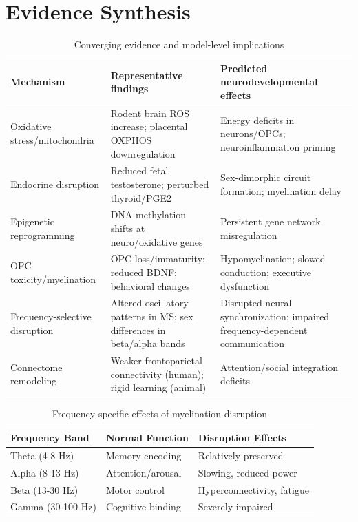 \documentclass[12pt]{article}
\begin{document}
\section{Evidence Synthesis}

\begin{table}[h]
\centering
\caption{Converging evidence and model-level implications}
\label{tab:mechanisms}
\begin{tabular}{@{}p{3cm}p{5cm}p{5cm}@{}}
\toprule
\textbf{Mechanism} & \textbf{Representative findings} & \textbf{Predicted neurodevelopmental effects} \\
\midrule
Oxidative stress/mitochondria & Rodent brain ROS increase; placental OXPHOS downregulation & Energy deficits in neurons/OPCs; neuroinflammation priming \\
Endocrine disruption & Reduced fetal testosterone; perturbed thyroid/PGE2 & Sex-dimorphic circuit formation; myelination delay \\
Epigenetic reprogramming & DNA methylation shifts at neuro/oxidative genes & Persistent gene network misregulation \\
OPC toxicity/myelination & OPC loss/immaturity; reduced BDNF; behavioral changes & Hypomyelination; slowed conduction; executive dysfunction \\
Frequency-selective disruption & Altered oscillatory patterns in MS; sex differences in beta/alpha bands & Disrupted neural synchronization; impaired frequency-dependent communication \\
Connectome remodeling & Weaker frontoparietal connectivity (human); rigid learning (animal) & Attention/social integration deficits \\
\bottomrule
\end{tabular}
\end{table}

\begin{table}[h]
\centering
\caption{Frequency-specific effects of myelination disruption}
\label{tab:frequencies}
\begin{tabular}{@{}lll@{}}
\toprule
\textbf{Frequency Band} & \textbf{Normal Function} & \textbf{Disruption Effects} \\
\midrule
Theta (4-8 Hz) & Memory encoding & Relatively preserved \\
Alpha (8-13 Hz) & Attention/arousal & Slowing, reduced power \\
Beta (13-30 Hz) & Motor control & Hyperconnectivity, fatigue \\
Gamma (30-100 Hz) & Cognitive binding & Severely impaired \\
\bottomrule
\end{tabular}
\end{table}
\end{document}
